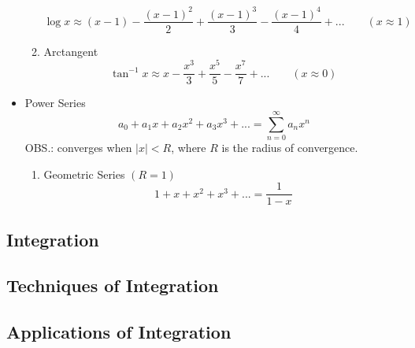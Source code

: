 \begin{itemize}
\begin{enumerate}
\begin{equation}
					\end{equation}
					\begin{equation}
						\log x \approx (x-1) - \frac{(x-1)^2}{2} + \frac{(x-1)^3}{3} - \frac{(x-1)^4}{4} + ... \qquad (x \approx 1)
					\end{equation}
				\item Arctangent
					\begin{equation}
						\tan^{-1} x \approx x - \frac{x^3}{3} + \frac{x^5}{5} - \frac{x^7}{7} + ... \qquad (x \approx 0)
					\end{equation}
			\end{enumerate}
		\item Power Series
			\begin{equation}
				a_0 + a_1x+a_2x^2+a_3x^3+...=\sum_{n=0}^{\infty} a_nx^n
			\end{equation}
			OBS.: converges when $|x|<R$, where $R$ is the radius of convergence.
			\begin{enumerate}
				\item Geometric Series $(R=1)$
					\begin{equation}
						1+x+x^2+x^3+... = \frac{1}{1-x}
					\end{equation}
			\end{enumerate}
	\end{itemize}
\subsection{Integration}
\subsection{Techniques of Integration}
\subsection{Applications of Integration}
